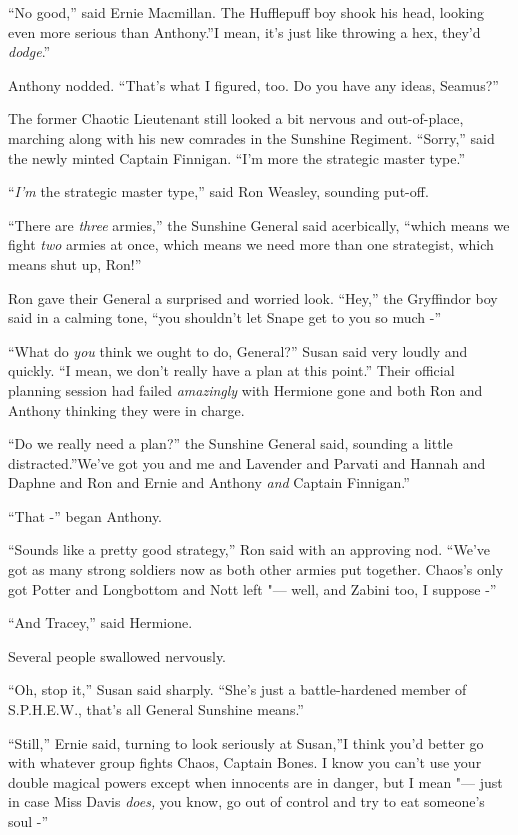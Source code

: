 ``No good,'' said Ernie Macmillan. The Hufflepuff boy shook his head,
looking even more serious than Anthony.''I mean, it's just like throwing
a hex, they'd \emph{dodge}.''

Anthony nodded. ``That's what I figured, too. Do you have any ideas,
Seamus?''

The former Chaotic Lieutenant still looked a bit nervous and
out-of-place, marching along with his new comrades in the Sunshine
Regiment. ``Sorry,'' said the newly minted Captain Finnigan. ``I'm more
the strategic master type.''

``\emph{I'm} the strategic master type,'' said Ron Weasley, sounding
put-off.

``There are \emph{three} armies,'' the Sunshine General said acerbically,
``which means we fight \emph{two} armies at once, which means we need
more than one strategist, which means shut up, Ron!''

Ron gave their General a surprised and worried look. ``Hey,'' the
Gryffindor boy said in a calming tone, ``you shouldn't let Snape get to
you so much -''

``What do \emph{you} think we ought to do, General?'' Susan said very
loudly and quickly. ``I mean, we don't really have a plan at this
point.'' Their official planning session had failed \emph{amazingly}
with Hermione gone and both Ron and Anthony thinking they were in
charge.

``Do we really need a plan?'' the Sunshine General said, sounding a
little distracted.''We've got you and me and Lavender and Parvati and
Hannah and Daphne and Ron and Ernie and Anthony \emph{and} Captain
Finnigan.''

``That -'' began Anthony.

``Sounds like a pretty good strategy,'' Ron said with an approving nod.
``We've got as many strong soldiers now as both other armies put
together. Chaos's only got Potter and Longbottom and Nott left "--- well,
and Zabini too, I suppose -''

``And Tracey,'' said Hermione.

Several people swallowed nervously.

``Oh, stop it,'' Susan said sharply. ``She's just a battle-hardened
member of S.P.H.E.W., that's all General Sunshine means.''

``Still,'' Ernie said, turning to look seriously at Susan,''I think
you'd better go with whatever group fights Chaos, Captain Bones. I know
you can't use your double magical powers except when innocents are in
danger, but I mean "--- just in case Miss Davis \emph{does,} you know, go
out of control and try to eat someone's soul -''

